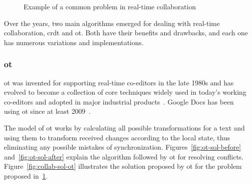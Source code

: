 \begin{figure}[H]
  \centerfloat

  \caption{Example of a common problem in real-time collaboration}
  \label{fig:collab-problem}
\end{figure}

Over the years, two main algorithms emerged for dealing with real-time collaboration, \acrfull{crdt} and \acrfull{ot}.
Both have their benefits and drawbacks, and each one has numerous variations and implementations.

\subsubsection{\acrfull{ot}}

\acrlong{ot} was invented for supporting real-time co-editors in the late 1980s and has evolved to become a collection of core techniques widely used in today's working co-editors and adopted in major industrial products~\autocite{sun_real_2020}.
Google Docs has been using \acrshort{ot} since at least 2009~\autocite{noauthor_whats_nodate}.

The model of \acrlong{ot} works by calculating all possible transformations for a text and using them to transform received changes according to the local state, thus eliminating any possible mistakes of synchronization.
Figures~\ref{fig:ot-sol-before} and~\ref{fig:ot-sol-after} explain the algorithm followed by \acrshort{ot} for resolving conflicts.
Figure~\ref{fig:collab-sol-ot} illustrates the solution proposed by \acrshort{ot} for the problem proposed in~\ref{fig:collab-problem}.


